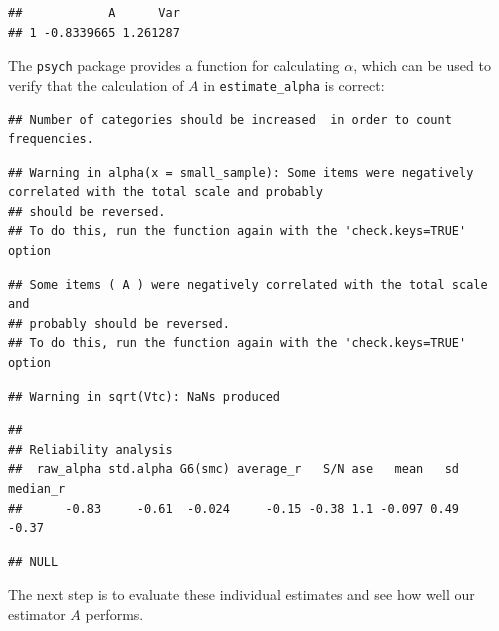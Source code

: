 \documentclass[
]{book}
\newenvironment{Shaded}{\begin{snugshade}}{\end{snugshade}}
\newcommand{\AttributeTok}[1]{\textcolor[rgb]{0.77,0.63,0.00}{#1}}
\newcommand{\FunctionTok}[1]{\textcolor[rgb]{0.00,0.00,0.00}{#1}}
\newcommand{\NormalTok}[1]{#1}
\newcommand{\SpecialCharTok}[1]{\textcolor[rgb]{0.00,0.00,0.00}{#1}}
\begin{document}
\begin{verbatim}
##            A      Var
## 1 -0.8339665 1.261287
\end{verbatim}

The \texttt{psych} package provides a function for calculating \(\alpha\), which can be used to verify that the calculation of \(A\) in \texttt{estimate\_alpha} is correct:

\begin{Shaded}
\end{Shaded}

\begin{verbatim}
## Number of categories should be increased  in order to count frequencies.
\end{verbatim}

\begin{verbatim}
## Warning in alpha(x = small_sample): Some items were negatively correlated with the total scale and probably 
## should be reversed.  
## To do this, run the function again with the 'check.keys=TRUE' option
\end{verbatim}

\begin{verbatim}
## Some items ( A ) were negatively correlated with the total scale and 
## probably should be reversed.  
## To do this, run the function again with the 'check.keys=TRUE' option
\end{verbatim}

\begin{verbatim}
## Warning in sqrt(Vtc): NaNs produced
\end{verbatim}

\begin{verbatim}
## 
## Reliability analysis   
##  raw_alpha std.alpha G6(smc) average_r   S/N ase   mean   sd median_r
##      -0.83     -0.61  -0.024     -0.15 -0.38 1.1 -0.097 0.49    -0.37
\end{verbatim}

\begin{verbatim}
## NULL
\end{verbatim}

The next step is to evaluate these individual estimates and see how well our estimator \(A\) performs.
\end{document}
